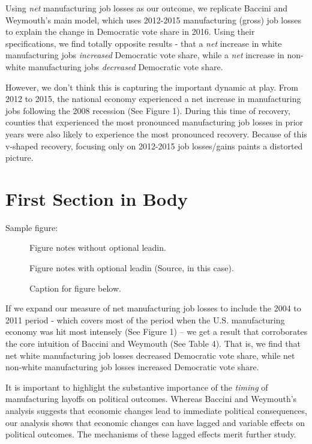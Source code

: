 \documentclass[]{AEA}
\begin{document}
Using \emph{net} manufacturing job losses as our outcome, we replicate
Baccini and Weymouth's main model, which uses 2012-2015 manufacturing
(gross) job losses to explain the change in Democratic vote share in
2016. Using their specifications, we find totally opposite results -
that a \emph{net} increase in white manufacturing jobs \emph{increased}
Democratic vote share, while a \emph{net} increase in non-white
manufacturing jobs \emph{decreased} Democratic vote share.

However, we don't think this is capturing the important dynamic at play.
From 2012 to 2015, the national economy experienced a net increase in
manufacturing jobs following the 2008 recession (See Figure 1). During
this time of recovery, counties that experienced the most pronounced
manufacturing job losses in prior years were also likely to experience
the most pronounced recovery. Because of this v-shaped recovery,
focusing only on 2012-2015 job losses/gains paints a distorted picture.

\section{First Section in Body}

Sample figure:

\begin{figure}





\caption{Caption for figure below.}
\begin{figurenotes}
Figure notes without optional leadin.
\end{figurenotes}
\begin{figurenotes}[Source]
Figure notes with optional leadin (Source, in this case).
\end{figurenotes}
\end{figure}

If we expand our measure of net manufacturing job losses to include the
2004 to 2011 period - which covers most of the period when the U.S.
manufacturing economy was hit most intensely (See Figure 1) -- we get a
result that corroborates the core intuition of Baccini and Weymouth (See
Table 4). That is, we find that net white manufacturing job losses
decreased Democratic vote share, while net non-white manufacturing job
losses increased Democratic vote share.

It is important to highlight the substantive importance of the
\emph{timing} of manufacturing layoffs on political outcomes. Whereas
Baccini and Weymouth's analysis suggests that economic changes lead to
immediate political consequences, our analysis shows that economic
changes can have lagged and variable effects on political outcomes. The
mechanisms of these lagged effects merit further study.
\end{document}
